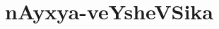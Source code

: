 \makeatletter
\def\@makechapterhead#1{%
  \vspace*{10\p@}%
\vspace*{25\p@}%
  {\parindent \z@ \centering \normalfont
    \ifnum \c@secnumdepth >\m@ne
      \if@mainmatter
        {\huge\bfseries  #1}\par\nobreak
	\vskip 4pt
      \fi
    \fi
\smallskip 

 \vskip 10\p@  
  }
\vskip 10\p@}
\makeatother


\chapter{nAyxya-veYsheVSika}\label{chap001}


